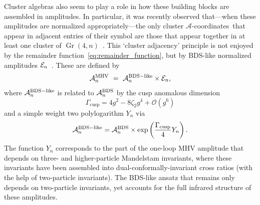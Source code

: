 \documentclass[12pt]{article}
\DeclareMathOperator{\Gr}{Gr}
\def\acoords{$\mathcal{A}$-coordinates}
\begin{document}
Cluster algebras also seem to play a role in how these building blocks are assembled in amplitudes. In particular, it was recently observed that---when these amplitudes are normalized appropriately---the only cluster \acoords\ that appear in adjacent entries of their symbol are those that appear together in at least one cluster of $\Gr(4,n)$~\cite{Drummond:2017ssj}. This `cluster adjacency' principle is not enjoyed by the remainder function~\eqref{eq:remainder_function}, but by BDS-like normalized amplitudes ${\cal E}_n$~\cite{Alday:2009dv,Yang:2010as,Caron-Huot:2016owq,Dixon:2016nkn}. These are defined by
\begin{equation} \label{eq:bds_like_normalized_amplitude}
\mathcal{A}_n^{\rm MHV}\ =\ \mathcal{A}_n^{\rm BDS-like}  \times  {\cal E}_n,
\end{equation}
where $\mathcal{A}_n^{\rm BDS-like}$ is related to $\mathcal{A}_n^{\rm BDS}$ by the cusp anomalous dimension~\cite{Beisert:2006ez} 
\begin{equation}
\Gamma_{\text{cusp}} = 4 g^2- 8 \zeta_2 g^4 + \mathcal{O}(g^6)
\end{equation}
and a simple weight two polylogarithm $Y_n$ via
\begin{equation} \label{eq:bds_like_ansatz}
\mathcal{A}_n^{\rm BDS-like} = \mathcal{A}_n^{\rm BDS} \times \exp\left( \frac{\Gamma_{\text{cusp}}}{4} Y_n \right).
\end{equation}
The function $Y_n$ corresponds to the part of the one-loop MHV amplitude that depends on three- and higher-particle Mandelstam invariants, where these invariants have been assembled into dual-conformally-invariant cross ratios (with the help of two-particle invariants). The BDS-like ansatz that remains only depends on two-particle invariants, yet accounts for the full infrared structure of these amplitudes. 
\end{document}
